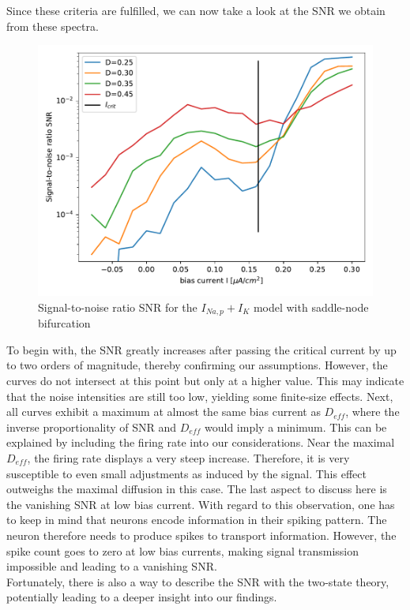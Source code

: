 \documentclass[12pt,a4paper]{article}
\begin{document}
Since these criteria are fulfilled, we can now take a look at the SNR we obtain from these spectra.
\begin{figure}[H]
	\centering
	\includegraphics[scale=1]{snrealonly2crit5.pdf}\caption{Signal-to-noise ratio SNR for the $I_{Na,p}+I_K$ model with saddle-node bifurcation}
	\label{specneur}
\end{figure}
To begin with, the SNR greatly increases after passing the critical current by up to two orders of magnitude, thereby confirming our assumptions. However, the curves do not intersect at this point but only at a higher value. This may indicate that the noise intensities are still too low, yielding some finite-size effects. Next, all curves exhibit a maximum at almost the same bias current as $D_{eff}$, where the inverse proportionality of SNR and $D_{eff}$ would imply a minimum. This can be explained by including the firing rate into our considerations. Near the maximal $D_{eff}$, the firing rate displays a very steep increase. Therefore, it is very susceptible to even small adjustments as induced by the signal. This effect outweighs the maximal diffusion in this case. The last aspect to discuss here is the vanishing SNR at low bias current. With regard to this observation, one has to keep in mind that neurons encode information in their spiking pattern. The neuron therefore needs to produce spikes to transport information. However, the spike count goes to zero at low bias currents, making signal transmission impossible and leading to a vanishing SNR.
\\
Fortunately, there is also a way to describe the SNR with the two-state theory, potentially leading to a deeper insight into our findings.
\end{document}
